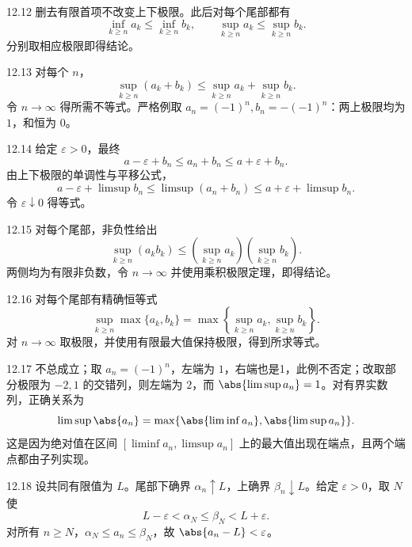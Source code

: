 \begin{solution}{12.12}
删去有限首项不改变上下极限。此后对每个尾部都有
\[
 \inf_{k\ge n}a_k\le\inf_{k\ge n}b_k,\qquad
 \sup_{k\ge n}a_k\le\sup_{k\ge n}b_k.
\]
分别取相应极限即得结论。
\end{solution}

\begin{solution}{12.13}
对每个 \(n\)，
\[
 \sup_{k\ge n}(a_k+b_k)
 \le \sup_{k\ge n}a_k+\sup_{k\ge n}b_k.
\]
令 \(n\to\infty\) 得所需不等式。严格例取
\(a_n=(-1)^n,b_n=-(-1)^n\)：两上极限均为 \(1\)，和恒为 \(0\)。
\end{solution}

\begin{solution}{12.14}
给定 \(\varepsilon>0\)，最终
\[
 a-\varepsilon+b_n\le a_n+b_n\le a+\varepsilon+b_n.
\]
由上下极限的单调性与平移公式，
\[
 a-\varepsilon+\limsup b_n
 \le\limsup(a_n+b_n)
 \le a+\varepsilon+\limsup b_n.
\]
令 \(\varepsilon\downarrow0\) 得等式。
\end{solution}

\begin{solution}{12.15}
对每个尾部，非负性给出
\[
 \sup_{k\ge n}(a_kb_k)
 \le\left(\sup_{k\ge n}a_k\right)
   \left(\sup_{k\ge n}b_k\right).
\]
两侧均为有限非负数，令 \(n\to\infty\) 并使用乘积极限定理，即得结论。
\end{solution}

\begin{solution}{12.16}
对每个尾部有精确恒等式
\[
 \sup_{k\ge n}\max\{a_k,b_k\}
 =\max\left\{\sup_{k\ge n}a_k,\sup_{k\ge n}b_k\right\}.
\]
对 \(n\to\infty\) 取极限，并使用有限最大值保持极限，得到所求等式。
\end{solution}

\begin{solution}{12.17}
不总成立；取 \(a_n=(-1)^n\)，左端为 \(1\)，右端也是1，此例不否定；改取部分极限为 \(-2,1\) 的交错列，则左端为 \(2\)，而
\(\abs{\limsup a_n}=1\)。对有界实数列，正确关系为
\[
 \limsup\abs{a_n}
 =\max\{\abs{\liminf a_n},\abs{\limsup a_n}\}.
\]
这是因为绝对值在区间 \([\liminf a_n,\limsup a_n]\) 上的最大值出现在端点，且两个端点都由子列实现。
\end{solution}

\begin{solution}{12.18}
设共同有限值为 \(L\)。尾部下确界 \(\alpha_n\uparrow L\)，上确界
\(\beta_n\downarrow L\)。给定 \(\varepsilon>0\)，取 \(N\) 使
\[
 L-\varepsilon<\alpha_N\le\beta_N<L+\varepsilon.
\]
对所有 \(n\ge N\)，\(\alpha_N\le a_n\le\beta_N\)，故
\(\abs{a_n-L}<\varepsilon\)。
\end{solution}

